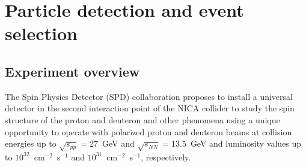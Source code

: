 \newpage
\chapter{Particle detection and event selection}
\mbox{}\vspace{-\baselineskip}
\label{chap:event_selection}

\section{Experiment overview}

The Spin Physics Detector (SPD) collaboration proposes to install a universal detector in the second interaction point of the NICA collider to study the spin structure of the proton and deuteron and other phenomena using a unique opportunity to operate with polarized proton and deuteron beams at collision energies up to $\sqrt{s_{pp}}=$27~GeV and $\sqrt{s_{NN}}=$13.5~GeV and luminosity values up to $10^{32}$~cm$^{-2}$~s$^{-1}$ and $10^{31}$~cm$^{-2}$~s$^{-1}$, respectively\cite{TDR_SPD,SPDproto:2021hnm,SPD_1st_stage,Arbuzov:2020cqg}.


